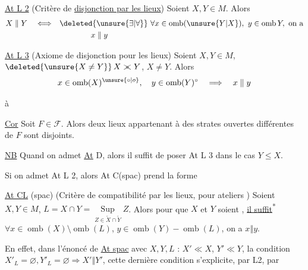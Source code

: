 
\uline{At L 2} (Critère de \uline{disjonction par les lieux}) Soient $X,Y\in M$. Alors
\[
 \begin{aligned}
 X\mathrel{\Vert}Y\quad\Longleftrightarrow\quad&
 \deleted{\unsure{\exists|\forall}}\ \forall x\in\operatorname{omb}(\unsure{Y|X}),\
 y\in\operatorname{omb}Y,\ \text{on a}\\
 &\hspace{4em} x\mathrel{\Vert}y
 \end{aligned}
\]


\uline{At L 3} (Axiome de disjonction pour les lieux) Soient $X,Y\in M$, $\deleted{\unsure{X\ne Y}}\,X\mathrel{>\mkern-10mu<}Y$, $X\ne Y$. Alors
\[
 x\in\operatorname{omb}(X)^{\unsure{\circ|o}},\quad
 y\in\operatorname{omb}(Y)^\circ\quad\Longrightarrow\quad x\mathrel{\Vert}y
\]

 à

\uline{Cor} Soit $F\in\mathscr{F}$. Alors deux lieux appartenant à des strates ouvertes différentes de $F$ sont disjoints.

\uline{NB} Quand on admet \uline{At} D, alors il suffit de poser At L 3 dans le cas $Y\leq X$.

Si on admet At L 2, alors At C(spac) prend la forme

\noindent\vrule\hspace{.5em}\begin{minipage}{.94\linewidth}
\uline{At CL} (spac) (Critère de compatibilité par les lieux, pour ateliers ) Soient $X,Y\in M$, $L=X\cap Y=\underset{Z\in\widetilde X\cap\widetilde Y}{\operatorname{Sup}}Z$. Alors pour que $X$ et $Y$ soient , \uline{il suffit}\textsuperscript{*} $\forall x\in\operatorname{omb}(X)\setminus\operatorname{omb}(L)$, $y\in\operatorname{omb}(Y)-\operatorname{omb}(L)$, on a $x\mathrel{\Vert}y$.
\end{minipage}

En effet,  dans l'énoncé de \uline{At spac} avec $X,Y,L$ : $X'\ll X$, $Y'\ll Y$, la condition $X'_L=\varnothing,Y'_L=\varnothing\Rightarrow X'\mathrel{\Vert}Y'$, cette dernière condition s'explicite, par L2, par
